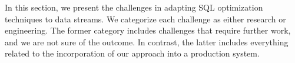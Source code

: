 \label {sec:fs-optimization-challenges}
In this section, we present the challenges in adapting SQL optimization techniques to data streams. We categorize each challenge as either research or engineering.  The former category includes challenges that require further work, and we are not sure of the outcome. In contrast, the latter includes everything related to the incorporation of our approach into a production system. 